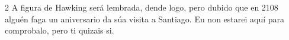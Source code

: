 \begin{multicols}{2}
A figura de Hawking será lembrada, dende logo, pero dubido que en 2108 alguén
faga un aniversario da súa visita a Santiago. Eu non estarei aquí para
comprobalo, pero ti quizais si.




\end{multicols}
